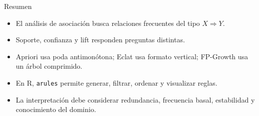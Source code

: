 \documentclass[10pt,aspectratio=169]{beamer}
\begin{document}

%
%

\begin{frame}{Resumen}
\begin{itemize}
  \item El análisis de asociación busca relaciones frecuentes del tipo $X \Rightarrow Y$.
  \item Soporte, confianza y lift responden preguntas distintas.
  \item Apriori usa poda antimonótona; Eclat usa formato vertical; FP-Growth usa un árbol comprimido.
  \item En R, \texttt{arules} permite generar, filtrar, ordenar y visualizar reglas.
  \item La interpretación debe considerar redundancia, frecuencia basal, estabilidad y conocimiento del dominio.
\end{itemize}
\end{frame}
\end{document}
